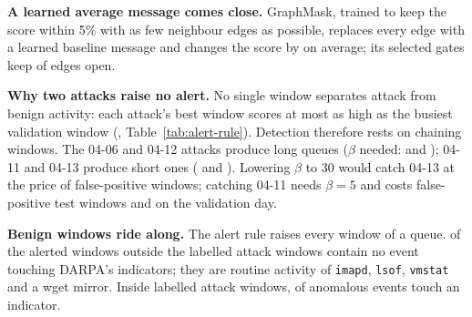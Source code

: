 \documentclass[conference]{IEEEtran}
\begin{document}
\textbf{A learned average message comes close.} GraphMask, trained to keep the score within 5\% with as
few neighbour edges as possible, replaces every edge with a learned baseline message and changes the
score by \GMAllClosedDev{} on average; its selected gates keep \GMOpenFrac{} of edges open.


\textbf{Why two attacks raise no alert.} No single window separates attack from benign activity: each
attack's best window scores at most as high as the busiest validation window (\ValMaxWindowScore{},
Table~\ref{tab:alert-rule}). Detection therefore rests on chaining windows. The 04-06 and 04-12 attacks
produce long queues ($\beta$ needed: \BetaNeededSix{} and \BetaNeededTwelve{}); 04-11 and 04-13 produce
short ones (\BetaNeededEleven{} and \BetaNeededThirteen{}). Lowering $\beta$ to 30 would catch 04-13 at
the price of \FPWindowsBetaThirty{} false-positive windows; catching 04-11 needs $\beta{=}5$ and costs
\FPWindowsBetaFive{} false-positive test windows and \ValFPWindowsBetaFive{} on the validation day.

\textbf{Benign windows ride along.} The alert rule raises every window of a queue. \NumRiderWindowsNoIOC{}
of the \NumRiderWindows{} alerted windows outside the labelled attack windows contain no event touching
DARPA's indicators; they are routine activity of \texttt{imapd}, \texttt{lsof}, \texttt{vmstat} and a
wget mirror. Inside labelled attack windows, \GTWindowIOCShare{} of anomalous events touch an indicator.
\end{document}
